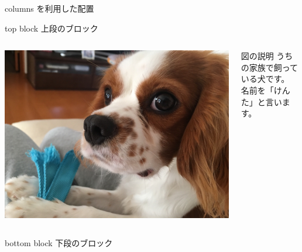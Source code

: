 \documentclass[dvipdfmx]{beamer}  %
\begin{document}
\begin{frame}{columns を利用した配置}
  \begin{block}{top block}
    上段のブロック
  \end{block}

  \begin{columns}[c]  %

    \begin{column}{0.3\textwidth}  %
      \includegraphics[width=\columnwidth]{./media/kenta2.jpg}
    \end{column}

    \begin{column}{0.65\textwidth}  %
      \begin{block}{図の説明}
        うちの家族で飼っている犬です。\\
        名前を「けんた」と言います。
      \end{block}
    \end{column}


  \end{columns}

  \begin{block}{bottom block}
    下段のブロック
  \end{block}

\end{frame}
\end{document}
